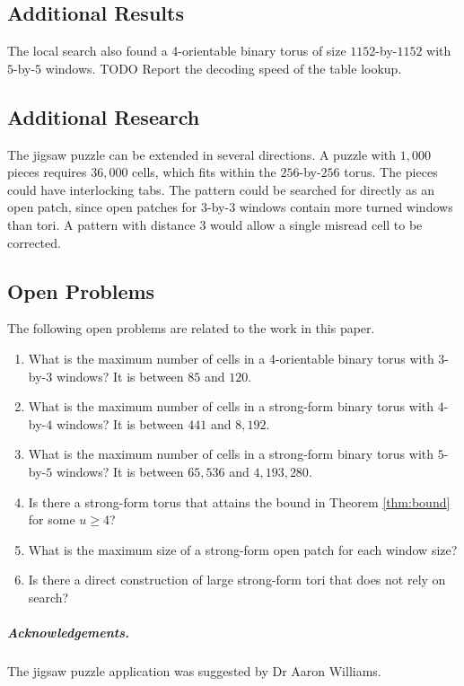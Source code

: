\documentclass{lipics-v2021}
\newcommand{\todo}[1]{{\color{blue}TODO #1}}
\begin{document}
\subsection{Additional Results}
\label{sec:final_additional}

The local search also found a 4-orientable binary torus of size $1152$-by-$1152$ with $5$-by-$5$ windows.
\todo{Report the decoding speed of the table lookup.}

\subsection{Additional Research}
\label{sec:final_research}

The jigsaw puzzle can be extended in several directions.
A puzzle with $1{,}000$ pieces requires $36{,}000$ cells, which fits within the $256$-by-$256$ torus.
The pieces could have interlocking tabs.
The pattern could be searched for directly as an open patch, since open patches for $3$-by-$3$ windows contain more turned windows than tori.
A pattern with distance $3$ would allow a single misread cell to be corrected.

\subsection{Open Problems}
\label{sec:final_open}

The following open problems are related to the work in this paper.
\begin{enumerate}
\item What is the maximum number of cells in a 4-orientable binary torus with $3$-by-$3$ windows? It is between $85$ and $120$.
\item What is the maximum number of cells in a strong-form binary torus with $4$-by-$4$ windows? It is between $441$ and $8{,}192$.
\item What is the maximum number of cells in a strong-form binary torus with $5$-by-$5$ windows? It is between $65{,}536$ and $4{,}193{,}280$.
\item Is there a strong-form torus that attains the bound in Theorem \ref{thm:bound} for some $u \geq 4$?
\item What is the maximum size of a strong-form open patch for each window size?
\item Is there a direct construction of large strong-form tori that does not rely on search?
\end{enumerate}

\subparagraph*{Acknowledgements.}
The jigsaw puzzle application was suggested by Dr Aaron Williams.
\end{document}
